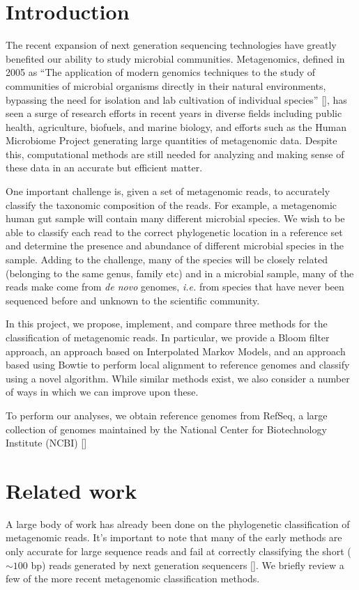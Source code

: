 \documentclass[12pt]{article} %
\begin{document}
\section{Introduction}
The recent expansion of next generation sequencing technologies have greatly benefited our ability to study microbial communities. Metagenomics, defined in 2005 as ``The application of modern genomics techniques to the study of communities of microbial organisms directly in their natural environments, bypassing the need for isolation and lab cultivation of individual species'' [\cite{Chen:2005dg}], has seen a surge of research efforts in recent years in diverse fields including public health, agriculture, biofuels, and marine biology, and efforts such as the Human Microbiome Project generating large quantities of metagenomic data. Despite this, computational methods are still needed for analyzing and making sense of these data in an accurate but efficient matter. 
\par
One important challenge is, given a set of metagenomic reads, to accurately classify the taxonomic composition of the reads. For example, a metagenomic human gut sample will contain many different microbial species. We wish to be able to classify each read to the correct phylogenetic location in a reference set and determine the presence and abundance of different microbial species in the sample. Adding to the challenge, many of the species will be closely related (belonging to the same genus, family etc) and in a microbial sample, many of the reads make come from \emph{de novo} genomes, \emph{i.e.} from species that have never been sequenced before and unknown to the scientific community. 
\par
In this project, we propose, implement, and compare three methods for the classification of metagenomic reads. In particular, we provide a Bloom filter approach, an approach based on Interpolated Markov Models, and an approach based using Bowtie to perform local alignment to reference genomes and classify using a novel algorithm. While similar methods exist, we also consider a number of ways in which we can improve upon these.
\par
To perform our analyses, we obtain reference genomes from RefSeq, a large collection of genomes maintained by the National Center for Biotechnology Institute (NCBI) [\cite{Pruitt:2009dg}] 
\section{Related work}
A large body of work has already been done on the phylogenetic classification of metagenomic reads. It's important to note that many of the early methods are only accurate for large sequence reads and fail at correctly classifying the short ($ \sim100$ bp) reads generated by next generation sequencers [\cite{Brady:2009dg}]. We briefly review a few of the more recent metagenomic classification methods.
\end{document}
